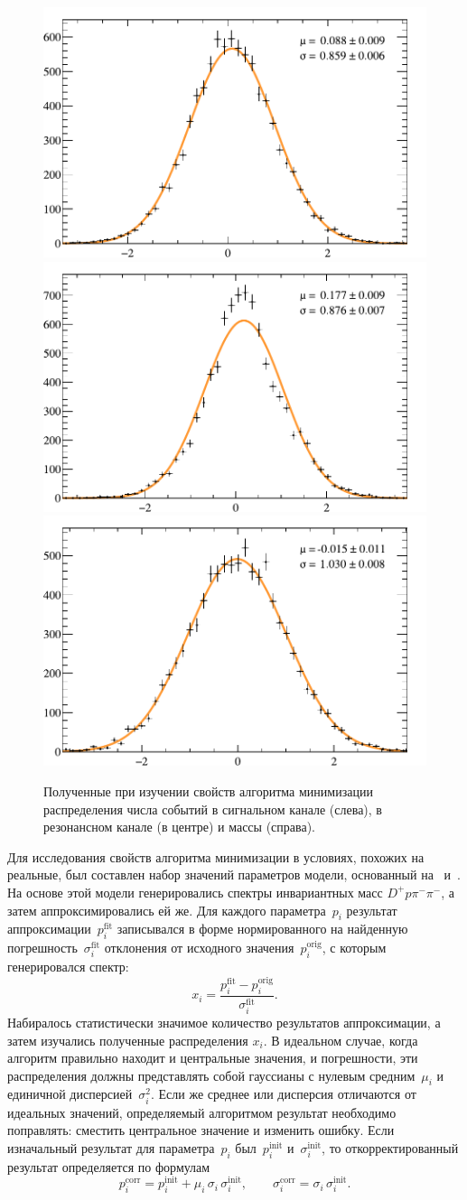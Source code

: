 \documentclass[a4paper, 12pt]{article}
\def\Dp{D^+}
\def\pim{\pi^-}
\begin{document}
\begin{figure}[b]
\includegraphics[width=.32\linewidth]{figures/toy_signal}
\includegraphics[width=.32\linewidth]{figures/toy_star}
\includegraphics[width=.32\linewidth]{figures/toy_mass}
\caption{Полученные при изучении свойств алгоритма минимизации распределения числа событий в сигнальном канале (слева), в резонансном канале (в центре) и массы (справа).}
\label{fig:toys}
\end{figure}

Для исследования свойств алгоритма минимизации в условиях, похожих на реальные, был составлен набор значений параметров модели, основанный на~\cite{LbLc_LHCb} и~\cite{PDG}. 
На основе этой модели генерировались спектры инвариантных масс $\Dp p\pim\pim$, а затем аппроксимировались ей же. 
Для каждого параметра~$p_i$ результат аппроксимации~$p^\mathrm{fit}_i$ записывался в форме нормированного на найденную погрешность~$\sigma^\mathrm{fit}_i$ отклонения от исходного значения~$p^\mathrm{orig}_i$, с которым генерировался спектр: 
\[ x_i = \frac{p^\mathrm{fit}_i - p^\mathrm{orig}_i}{\sigma^\mathrm{fit}_i}. \]
Набиралось статистически значимое количество результатов аппроксимации, а затем изучались полученные распределения $x_i$. 
В идеальном случае, когда алгоритм правильно находит и центральные значения, и погрешности, эти распределения должны представлять собой гауссианы с нулевым средним~$\mu_i$ и единичной дисперсией~$\sigma^2_i$. 
Если же среднее или дисперсия отличаются от идеальных значений, определяемый алгоритмом результат необходимо поправлять: сместить центральное значение и изменить ошибку. Если изначальный результат для параметра~$p_i$ был~$p^\mathrm{init}_i$ и~$\sigma^\mathrm{init}_i$, то откорректированный результат определяется по формулам
$$ p_i^\mathrm{corr} = p^\mathrm{init}_i + \mu_i\,\sigma_i\,\sigma^\mathrm{init}_i,
\qquad
\sigma_i^\mathrm{corr} = \sigma_i\,\sigma^\mathrm{init}_i. $$
\end{document}
